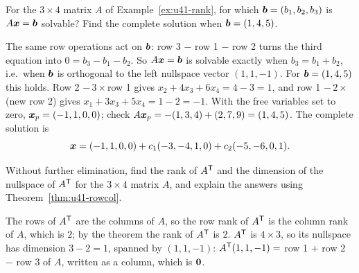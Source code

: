 \begin{exercise}\label{exr:u41-solvable}
For the $3\times4$ matrix $A$ of Example~\ref{ex:u41-rank}, for which $\boldsymbol{b}=(b_1,b_2,b_3)$ is $A\boldsymbol{x}=\boldsymbol{b}$ solvable? Find the complete solution when $\boldsymbol{b}=(1,4,5)$.
\end{exercise}
\begin{solution}
The same row operations act on $\boldsymbol{b}$: row 3 $-$ row 1 $-$ row 2 turns the third equation into $0=b_3-b_1-b_2$. So $A\boldsymbol{x}=\boldsymbol{b}$ is solvable exactly when $b_3=b_1+b_2$, i.e.\ when $\boldsymbol{b}$ is orthogonal to the left nullspace vector $(1,1,-1)$. For $\boldsymbol{b}=(1,4,5)$ this holds. Row 2 $-\,3\times$row 1 gives $x_2+4x_3+6x_4=4-3=1$, and row 1 $-\,2\times$(new row 2) gives $x_1+3x_3+5x_4=1-2=-1$. With the free variables set to zero, $\boldsymbol{x}_p=(-1,1,0,0)$; check $A\boldsymbol{x}_p=-(1,3,4)+(2,7,9)=(1,4,5)$. The complete solution is
\[
\boldsymbol{x}=(-1,1,0,0)+c_1(-3,-4,1,0)+c_2(-5,-6,0,1).
\]
\end{solution}

\begin{exercise}\label{exr:u41-transpose}
Without further elimination, find the rank of $A^{\mathsf{T}}$ and the dimension of the nullspace of $A^{\mathsf{T}}$ for the $3\times4$ matrix $A$, and explain the answers using Theorem~\ref{thm:u41-rowcol}.
\end{exercise}
\begin{solution}
The rows of $A^{\mathsf{T}}$ are the columns of $A$, so the row rank of $A^{\mathsf{T}}$ is the column rank of $A$, which is $2$; by the theorem the rank of $A^{\mathsf{T}}$ is $2$. $A^{\mathsf{T}}$ is $4\times3$, so its nullspace has dimension $3-2=1$, spanned by $(1,1,-1)$: $A^{\mathsf{T}}(1,1,-1)=$ row 1 $+$ row 2 $-$ row 3 of $A$, written as a column, which is $\boldsymbol{0}$.
\end{solution}
